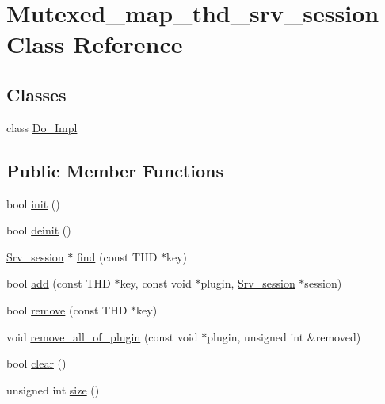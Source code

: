 \hypertarget{classMutexed__map__thd__srv__session}{}\section{Mutexed\+\_\+map\+\_\+thd\+\_\+srv\+\_\+session Class Reference}
\label{classMutexed__map__thd__srv__session}
\subsection*{Classes}
\begin{DoxyCompactItemize}
\item 
class \mbox{\hyperlink{classMutexed__map__thd__srv__session_1_1Do__Impl}{Do\+\_\+\+Impl}}
\end{DoxyCompactItemize}
\subsection*{Public Member Functions}
\begin{DoxyCompactItemize}
\item 
bool \mbox{\hyperlink{classMutexed__map__thd__srv__session_a6f50806bddeeb218cd03c27cba2f58a4}{init}} ()
\item 
bool \mbox{\hyperlink{classMutexed__map__thd__srv__session_a4b06c343737e4ef2e46f2eeecdeeb187}{deinit}} ()
\item 
\mbox{\hyperlink{classSrv__session}{Srv\+\_\+session}} $\ast$ \mbox{\hyperlink{classMutexed__map__thd__srv__session_afbc580641d60bb9ac333db5a826e098f}{find}} (const T\+HD $\ast$key)
\item 
bool \mbox{\hyperlink{classMutexed__map__thd__srv__session_ac2cb871bfc4a7a903784db38b8587d2d}{add}} (const T\+HD $\ast$key, const void $\ast$plugin, \mbox{\hyperlink{classSrv__session}{Srv\+\_\+session}} $\ast$session)
\item 
bool \mbox{\hyperlink{classMutexed__map__thd__srv__session_aeb691ab25dc82da3a4a778ac202ae21b}{remove}} (const T\+HD $\ast$key)
\item 
void \mbox{\hyperlink{classMutexed__map__thd__srv__session_a0645d00fbc8ef1d71612e0391c9029f9}{remove\+\_\+all\+\_\+of\+\_\+plugin}} (const void $\ast$plugin, unsigned int \&removed)
\item 
bool \mbox{\hyperlink{classMutexed__map__thd__srv__session_a747fdb30bf6388acdfebc23b8919944a}{clear}} ()
\item 
unsigned int \mbox{\hyperlink{classMutexed__map__thd__srv__session_a377c0a20e7dff0d814d39e904ff5d41b}{size}} ()
\end{DoxyCompactItemize}


